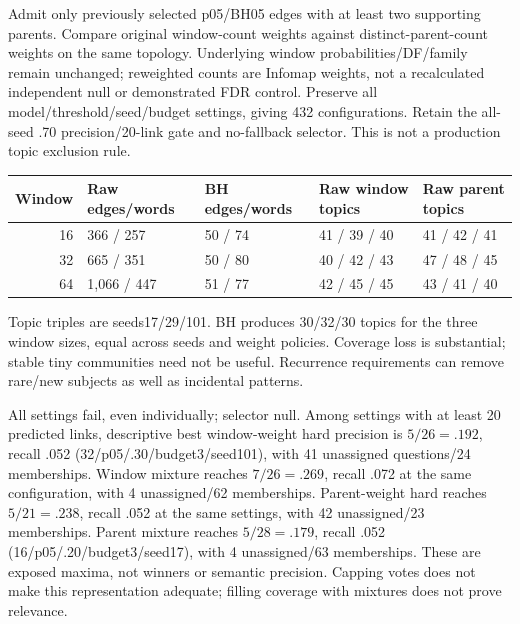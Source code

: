 \documentclass[11pt]{article}
\begin{document}
Admit only previously selected p05/BH05 edges with at least two supporting
parents. Compare original window-count weights against distinct-parent-count
weights on the same topology. Underlying window probabilities/DF/family remain
unchanged; reweighted counts are Infomap weights, not a recalculated independent
null or demonstrated FDR control. Preserve all model/threshold/seed/budget
settings, giving 432 configurations. Retain the all-seed .70 precision/20-link
gate and no-fallback selector. This is not a production topic exclusion rule.

\begin{center}\small
\begin{tabular}{rllll}\toprule
Window & Raw edges/words & BH edges/words & Raw window topics & Raw parent topics\\\midrule
16 & 366 / 257 & 50 / 74 & 41 / 39 / 40 & 41 / 42 / 41\\
32 & 665 / 351 & 50 / 80 & 40 / 42 / 43 & 47 / 48 / 45\\
64 & 1,066 / 447 & 51 / 77 & 42 / 45 / 45 & 43 / 41 / 40\\\bottomrule
\end{tabular}\end{center}
Topic triples are seeds17/29/101. BH produces 30/32/30 topics for the three
window sizes, equal across seeds and weight policies. Coverage loss is
substantial; stable tiny communities need not be useful. Recurrence requirements
can remove rare/new subjects as well as incidental patterns.

All settings fail, even individually; selector null. Among settings with at
least 20 predicted links, descriptive best window-weight hard precision is
$5/26=.192$, recall .052 (32/p05/.30/budget3/seed101), with 41 unassigned
questions/24 memberships. Window mixture reaches $7/26=.269$, recall .072 at the
same configuration, with 4 unassigned/62 memberships. Parent-weight hard
reaches $5/21=.238$, recall .052 at the same settings, with 42 unassigned/23
memberships. Parent mixture reaches $5/28=.179$, recall .052
(16/p05/.20/budget3/seed17), with 4 unassigned/63 memberships. These are exposed
maxima, not winners or semantic precision. Capping votes does not make this
representation adequate; filling coverage with mixtures does not prove relevance.
\end{document}
